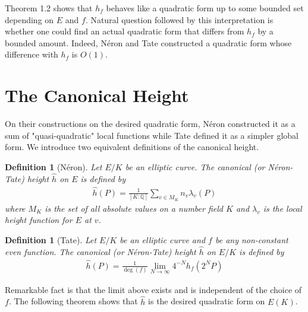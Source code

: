 \documentclass[11pt]{article}
\newcommand{\<}{\langle}
\renewcommand{\>}{\rangle}
\numberwithin{equation}{section}
\theoremstyle{plain}
\newtheorem{defn}[thm]{Definition}
\theoremstyle{definition}
\begin{document}
    Theorem 1.2 shows that \(h_f\) behaves like a quadratic form up to some bounded set depending on \(E\) and \(f\). Natural question followed by this interpretation is whether one could find an actual quadratic form that differs from \(h_f\) by a bounded amount. Indeed, N\'eron and Tate constructed a quadratic form whose difference with \(h_f\) is \(O(1)\).
    
\section{The Canonical Height} \label{section-C}
    On their constructions on the desired quadratic form, N\'eron constructed it as a sum of "quasi-quadratic" local functions while Tate defined it as a simpler global form. We introduce two equivalent definitions of the canonical height.
    
    
    \begin{defn}[N\'eron] Let \(E/K\) be an elliptic curve. The canonical (or N\'eron-Tate) height \(\hat{h}\) on \(E\) is defined by
        \begin{align*}
            \hat{h}(P) = \frac{1}{[K:\mathbb{Q}]} \sum_{v \in M_K} n_v \lambda_v(P)
        \end{align*}
    where \(M_K\) is the set of all absolute values on a number field \(K\) and \(\lambda_v\) is the local height function for \(E\) at \(v\).
    \end{defn}
    
    \begin{defn}[Tate] Let \(E/K\) be an elliptic curve and \(f\) be any non-constant even function. The canonical (or N\'eron-Tate) height \(\hat{h}\) on \(E/K\) is defined by
        \begin{align*}
         \hat{h}(P) = \frac{1}{\deg(f)} \lim_{N \to \infty} 4^{-N} h_f( 2^N P)
        \end{align*}
    \end{defn}
    
    Remarkable fact is that the limit above exists and is independent of the choice of \(f\). The following theorem shows that \(\hat{h}\) is the desired quadratic form on \(E(K)\).
    
\end{document}
